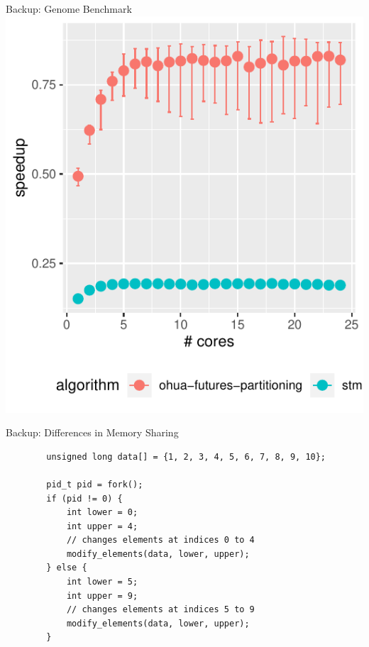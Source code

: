 \documentclass[aspectratio=169, usenames, dvipsnames]{beamer}
\begin{document}
\begin{frame}{Backup: Genome Benchmark}
    \centering
    \includegraphics[width=.5\textwidth,height=.7\textheight,keepaspectratio]{img/results/genome++}
\end{frame}

\begin{frame}[fragile]{Backup: Differences in Memory Sharing}
    \begin{verbatim}
        unsigned long data[] = {1, 2, 3, 4, 5, 6, 7, 8, 9, 10};

        pid_t pid = fork();
        if (pid != 0) {
            int lower = 0;
            int upper = 4;
            // changes elements at indices 0 to 4
            modify_elements(data, lower, upper);
        } else {
            int lower = 5;
            int upper = 9;
            // changes elements at indices 5 to 9
            modify_elements(data, lower, upper);
        }
    \end{verbatim}

\end{frame}
\end{document}
